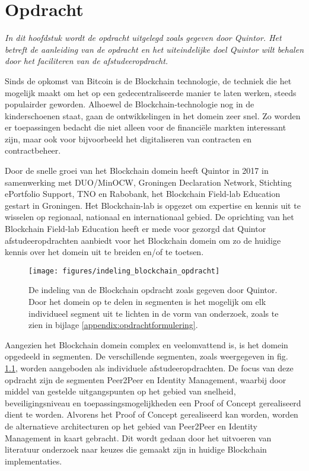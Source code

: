 \chapter{Opdracht}

\textit{In dit hoofdstuk wordt de opdracht uitgelegd zoals gegeven door Quintor. Het betreft de aanleiding van de opdracht en het uiteindelijke doel Quintor wilt behalen door het faciliteren van de afstudeeropdracht. }

Sinds de opkomst van Bitcoin is de Blockchain technologie, de techniek die het mogelijk maakt om het op een gedecentraliseerde manier te laten werken, steeds populairder geworden. Alhoewel de Blockchain-technologie nog in de kinderschoenen staat, gaan de ontwikkelingen in het domein zeer snel. Zo worden er toepassingen bedacht die niet alleen voor de financiële markten interessant zijn, maar ook voor bijvoorbeeld het digitaliseren van contracten en contractbeheer. 

Door de snelle groei van het Blockchain domein heeft Quintor in 2017 in samenwerking met DUO/MinOCW, Groningen Declaration Network, Stichting ePortfolio Support, TNO en Rabobank, het Blockchain Field-lab Education gestart in Groningen. Het Blockchain-lab is opgezet om expertise en kennis uit te wisselen op regionaal, nationaal en internationaal gebied. De oprichting van het Blockchain Field-lab Education heeft er mede voor gezorgd dat Quintor afstudeeropdrachten aanbiedt voor het Blockchain domein om zo de huidige kennis over het domein uit te breiden en/of te toetsen.

\begin{figure}[h]
  \centering
  \texttt{[image: figures/indeling\_blockchain\_opdracht]}
  \caption[Indeling opdracht Blockchain Quintor.]{
    De indeling van de Blockchain opdracht zoals gegeven door Quintor. Door het domein op te delen in segmenten is het mogelijk om elk individueel segment uit te lichten in de vorm van onderzoek, zoals te zien in bijlage \ref{appendix:opdrachtformulering}.
  }
  \label{fig:indeling_blockchain_opdracht} 
\end{figure}

\clearpage
Aangezien het Blockchain domein complex en veelomvattend is, is het domein opgedeeld in segmenten. De verschillende segmenten, zoals weergegeven in fig. \ref{fig:indeling_blockchain_opdracht}, worden aangeboden als individuele afstudeeropdrachten. De focus van deze opdracht zijn de segmenten Peer2Peer en Identity Management, waarbij door middel van gestelde uitgangspunten op het gebied van snelheid, beveiligingsniveau en toepassingsmogelijkheden een Proof of Concept gerealiseerd dient te worden. Alvorens het Proof of Concept gerealiseerd kan worden, worden de alternatieve architecturen op het gebied van Peer2Peer en Identity Management in kaart gebracht. Dit wordt gedaan door het uitvoeren van literatuur onderzoek naar keuzes die gemaakt zijn in huidige Blockchain implementaties.

